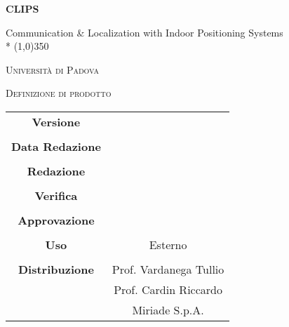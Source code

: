 \documentclass[a4paper,12pt]{article}
\author{}
\date{03/03/2016}
\begin{document}
\begin{titlepage}
	\centering
	{\huge\bfseries CLIPS\par}
	Communication \& Localization with Indoor Positioning Systems \\*
	\line(1,0){350} \\
	{\scshape\LARGE Università di Padova \par}
	\vspace{1cm}
	{\scshape\Large Definizione di prodotto \par}
	\logo
	\newpage
		\begin{tabular}{c|c}
			{\hfill \textbf{Versione}} 			& 					\\ \\
			{\hfill\textbf{Data Redazione}} 	&            		\\ \\
			{\hfill\textbf{Redazione}} 			&  					\\ \\
			{\hfill\textbf{Verifica}} 			&  					\\ \\
			{\hfill\textbf{Approvazione}} 		&  					\\ \\
			{\hfill\textbf{Uso}} 				& Esterno			\\ \\
			{\hfill\textbf{Distribuzione}} 		& Prof. Vardanega Tullio \\
												& Prof. Cardin Riccardo \\
												& Miriade S.p.A. \\
		\end{tabular}
	\end{titlepage}
	
	\newpage
	\pagestyle{myfront}
		
	\newpage
		\tableofcontents
	\newpage
		\listoffigures	
	\label{LastFrontPage}
	\newpage
	
	\pagestyle{mymain}
	
	 \newpage
		
		
	\label{LastPage}
\end{document}
